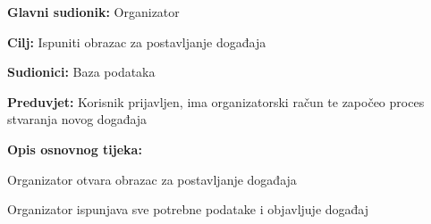 					\noindent {}
\begin{packed_item}
	\item \textbf{Glavni sudionik:} Organizator
	\item  \textbf{Cilj:} Ispuniti obrazac za postavljanje događaja
	\item  \textbf{Sudionici:} Baza podataka
	\item  \textbf{Preduvjet:} Korisnik prijavljen, ima organizatorski račun te započeo proces stvaranja novog događaja
	\item  \textbf{Opis osnovnog tijeka:}
	
	\item[] \begin{packed_enum}
		
		\item Organizator otvara obrazac za postavljanje događaja
		\item Organizator ispunjava sve potrebne podatake i objavljuje događaj
	\end{packed_enum}

\end{packed_item}


